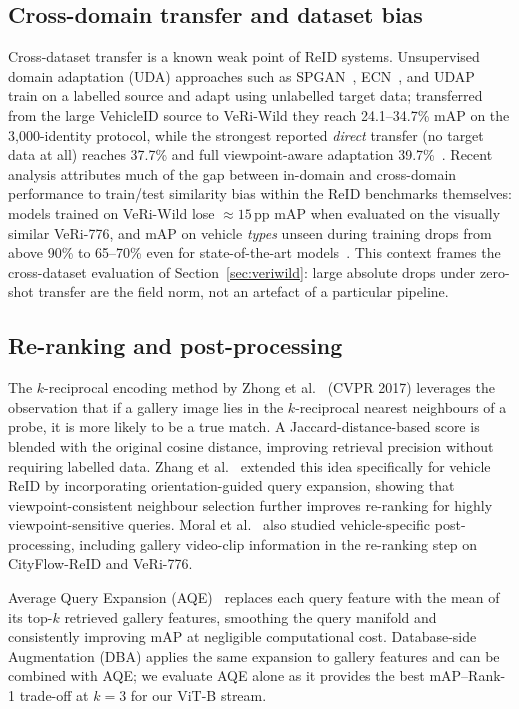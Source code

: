 \documentclass[10pt,a4paper]{article}
\begin{document}
\subsection{Cross-domain transfer and dataset bias}
Cross-dataset transfer is a known weak point of ReID systems. Unsupervised
domain adaptation (UDA) approaches such as SPGAN~\cite{deng2018spgan},
ECN~\cite{zhong2019ecn}, and UDAP~\cite{song2020udap} train on a labelled
source and adapt using unlabelled target data; transferred from the large
VehicleID source to VeRi-Wild they reach 24.1--34.7\% mAP on the
3{,}000-identity protocol, while the strongest reported \emph{direct} transfer
(no target data at all) reaches 37.7\% and full viewpoint-aware adaptation
39.7\%~\cite{zheng2020vapc}. Recent analysis attributes much of the gap between
in-domain and cross-domain performance to train/test similarity bias within the
ReID benchmarks themselves: models trained on VeRi-Wild lose
${\approx}15$\,pp mAP when evaluated on the visually similar VeRi-776, and mAP
on vehicle \emph{types} unseen during training drops from above 90\% to
65--70\% even for state-of-the-art models~\cite{benmabrouk2026genlimits}. This
context frames the cross-dataset evaluation of Section~\ref{sec:veriwild}:
large absolute drops under zero-shot transfer are the field norm, not an
artefact of a particular pipeline.

\subsection{Re-ranking and post-processing}
The $k$-reciprocal encoding method by Zhong et al.~\cite{zhong2017rerank} (CVPR
2017) leverages the observation that if a gallery image lies in the
$k$-reciprocal nearest neighbours of a probe, it is more likely to be a true
match. A Jaccard-distance-based score is blended with the original cosine
distance, improving retrieval precision without requiring labelled data. Zhang
et al.~\cite{zhang2022vehiclererank} extended this idea specifically for
vehicle ReID by incorporating orientation-guided query expansion, showing that
viewpoint-consistent neighbour selection further improves re-ranking for highly
viewpoint-sensitive queries. Moral et al.~\cite{moral2023syntheticrerank} also
studied vehicle-specific post-processing, including gallery video-clip
information in the re-ranking step on CityFlow-ReID and VeRi-776.

Average Query Expansion (AQE)~\cite{arandjelovic2012aqe} replaces each query
feature with the mean of its top-$k$ retrieved gallery features, smoothing the
query manifold and consistently improving mAP at negligible computational cost.
Database-side Augmentation (DBA) applies the same expansion to gallery features
and can be combined with AQE; we evaluate AQE alone as it provides the best
mAP--Rank-1 trade-off at $k{=}3$ for our ViT-B stream.
\end{document}

